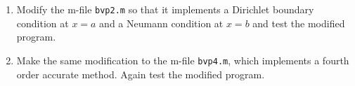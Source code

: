 


\begin{enumerate}

\item Modify the m-file {\tt bvp2.m}
so that it implements a Dirichlet boundary condition at
$x=a$ and a Neumann condition at $x=b$ and test the modified program.

\item Make the same modification to the m-file {\tt bvp4.m}, which
implements a fourth order accurate method.  Again test the modified program.

\end{enumerate} 
